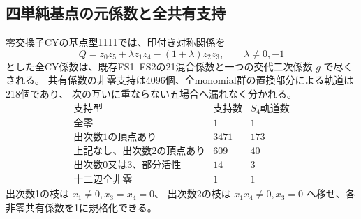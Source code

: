 \subsection{四単純基点の元係数と全共有支持}
\label{subsec:cubic-CY-four-point-support}
\begin{lemma}\label{lem:cubic-CY-four-point-support}
零交換子CYの基点型1111では、印付き対称関係を
\[
 Q=z_0z_5+\lambda z_1z_4-(1+\lambda)z_2z_3,\qquad \lambda\ne0,-1
\]
とした全CY係数は、既存FS1--FS2の21混合係数と一つの交代二次係数 $g$ で尽くされる。
共有係数の非零支持は4096個、全monomial群の置換部分による軌道は218個であり、
次の互いに重ならない五場合へ漏れなく分かれる。
\[
\begin{array}{c|r|r}
\text{支持型}&\text{支持数}&S_4\text{軌道数}\\\hline
\text{全零}&1&1\\
\text{出次数1の頂点あり}&3471&173\\
\text{上記なし、出次数2の頂点あり}&609&40\\
\text{出次数0又は3、部分活性}&14&3\\
\text{十二辺全非零}&1&1
\end{array}
\]
出次数1の枝は $x_1\ne0,x_3=x_4=0$、
出次数2の枝は $x_1x_4\ne0,x_3=0$ へ移せ、各非零共有係数を1に規格化できる。
\end{lemma}
